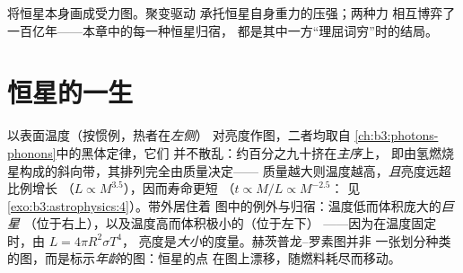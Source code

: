 \begin{omfigure}

{\small 将恒星本身画成受力图。聚变驱动
承托恒星自身重力的压强；两种力
相互博弈了一百亿年——本章中的每一种恒星归宿，
都是其中一方“理屈词穷”时的结局。}
\end{omfigure}

\section{恒星的一生}

\begin{definition}\label{def:b3:astrophysics:hr}
以表面温度（按惯例，热者在\emph{左侧}）
对亮度作图，二者均取自
\cref{ch:b3:photons-phonons}中的黑体定律，它们
并不散乱：约百分之九十挤在\emph{主序}上，
即由氢燃烧星构成的斜向带，其排列完全由质量决定——
质量越大则温度越高，\emph{且}亮度远超比例增长
（$L \propto M^{3.5}$），因而寿命更短
（$t \propto M/L \propto M^{-2.5}$：
见\cref{exo:b3:astrophysics:4}）。带外居住着
图中的例外与归宿：温度低而体积庞大的\emph{巨星}
（位于右上），以及温度高而体积极小的\emph{}（位于左下）
——因为在温度固定时，由 $L = 4\pi R^2\sigma T^4$，
亮度是\emph{大小}的度量。赫茨普龙–罗素图并非
一张划分种类的图，而是标示\emph{年龄}的图：恒星的点
在图上漂移，随燃料耗尽而移动。
\end{definition}

